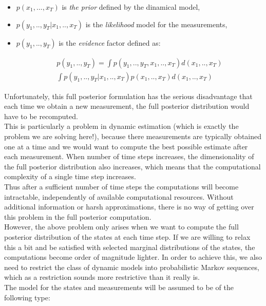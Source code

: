 \documentclass[10pt]{llncs}
\begin{document}
\begin{itemize}
\item $p(x_1,...,x_T)$ is \textit{the prior} defined by the dinamical model,

\item $p(y_1 , . . ,y_T | x_1 , . ., x_T)$ is the \textit{likelihood} model for the measurements,

\item $p(y_1,..,y_T)$ is the \textit{evidence} factor defined as: 

\begin{eqnarray} \label{eqn: Evidence eq}
p(y_1,..,y_T)=
\int p(y_1 , . . ,y_T , x_1 , . ., x_T  ) d(x_1 , . ., x_T ) \nonumber \\
\int p(y_1 , . . ,y_T | x_1 , . ., x_T  ) p(x_1 , . ., x_T ) d(x_1 , . ., x_T )
\end{eqnarray}

\end{itemize}
Unfortunately, this full posterior formulation has the serious disadvantage that each
time we obtain a new measurement, the full posterior distribution would have to
be recomputed. \\
This is particularly a problem in dynamic estimation (which is exactly the problem we are solving here!), because there measurements are typically obtained one at a time and we would want to compute the best possible estimate after each measurement. When number of time steps increases, the dimensionality of the full posterior distribution also increases, which means that the computational complexity of a single time step increases.\\
Thus after a sufficient number of time steps the computations will become intractable, independently of available computational resources. Without additional information or harsh approximations, there is no way of getting over this problem in the full posterior computation.\\
However, the above problem only arises when we want to compute the full posterior distribution of the states at each time step. If we are willing to relax this a bit and be satisfied with selected marginal distributions of the states, the computations become order of magnitude lighter. In order to achieve this, we also need to restrict the class of dynamic models into probabilistic Markov sequences, which as a restriction sounds more restrictive than it really is.\\
The model for the states and measurements will be assumed to be of the following type:\\
\end{document}
